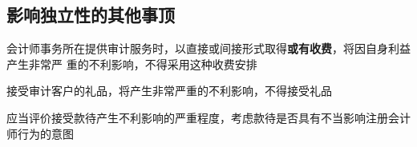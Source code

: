 \documentclass[UTF8,12pt]{ctexart}
\numberwithin{equation}{section} %
\numberwithin{figure}{section}
\numberwithin{table}{section}
\begin{document}
	\subsection{影响独立性的其他事顶}
	会计师事务所在提供审计服务时，以直接或间接形式取得\textbf{或有收费}，将因自身利益产生非常严 重的不利影响，不得采用这种收费安排
	
	接受审计客户的礼品，将产生非常严重的不利影响，不得接受礼品
	 
	应当评价接受款待产生不利影响的严重程度，考虑款待是否具有不当影响注册会计师行为的意图
	
\end{document}
